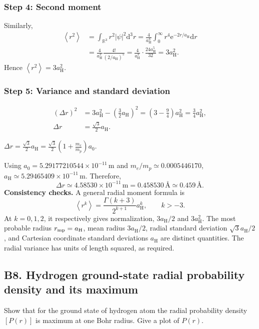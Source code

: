 \documentclass[11pt,a4paper]{article}
\newcommand{\key}[1]{\begin{resultbox}\centering\(\displaystyle #1\)\end{resultbox}}
\newcommand{\dd}{\mathrm{d}}
\newcommand{\ee}{\mathrm{e}}
\newcommand{\avg}[1]{\left\langle #1\right\rangle}
\newcommand{\R}{\mathbb R}
\newcommand{\aH}{a_{\mathrm H}}
\begin{document}
\subsubsection*{Step 4: Second moment}
Similarly,
\begin{align}
\avg{r^2}&=\int_{\R^3}r^2|\psi|^2\dd^3r=\frac4{\aH^3}\int_0^\infty r^4\ee^{-2r/\aH}\dd r\\
&=\frac4{\aH^3}\frac{4!}{(2/\aH)^5}=\frac4{\aH^3}\cdot\frac{24\aH^5}{32}=3\aH^2.
\end{align}
Hence \(\boxed{\avg{r^2}=3\aH^2}\).

\subsubsection*{Step 5: Variance and standard deviation}
\begin{align}
(\Delta r)^2&=3\aH^2-\left(\frac32\aH\right)^2=\left(3-\frac94\right)\aH^2=\frac34\aH^2,\\
\Delta r&=\frac{\sqrt3}{2}\aH.
\end{align}
\key{\boxed{\Delta r=\frac{\sqrt3}{2}\aH=\frac{\sqrt3}{2}\left(1+\frac{m_e}{m_p}\right)a_0.}}
Using \(a_0=5.29177210544\times10^{-11}\,\mathrm m\) and \(m_e/m_p\simeq0.0005446170\), \(\aH\simeq5.29465409\times10^{-11}\,\mathrm m\). Therefore,
\begin{equation}\boxed{\Delta r\simeq4.58530\times10^{-11}\,\mathrm m=0.458530\,\text{\AA}\simeq0.459\,\text{\AA}.}\end{equation}
\textbf{Consistency checks.} A general radial moment formula is
\begin{equation}\avg{r^k}=\frac{\Gamma(k+3)}{2^{k+1}}\aH^k,\qquad k>-3.\end{equation}
At \(k=0,1,2\), it respectively gives normalization, \(3\aH/2\) and \(3\aH^2\). The most probable radius \(r_{\rm mp}=\aH\), mean radius \(3\aH/2\), radial standard deviation \(\sqrt3\aH/2\), and Cartesian coordinate standard deviations \(\aH\) are distinct quantities. The radial variance has units of length squared, as required.

\subsection{B8. Hydrogen ground-state radial probability density and its maximum}
\begin{questionbox}Show that for the ground state of hydrogen atom the radial probability density \([P(r)]\) is maximum at one Bohr radius. Give a plot of \(P(r)\).\end{questionbox}
\end{document}
